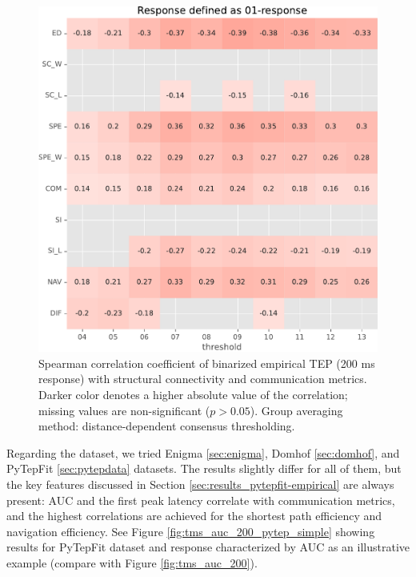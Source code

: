 \begin{figure}
    \centering
    \includegraphics[width=\textwidth]{images/nootebook_generated/tmseeg_results/empirical/200/not_over_threshold_nan/Mica-Mics_dist/Response defined as 01-response.pdf}
    \caption[Binarized TEP (200 ms) correlations (dist)]{Spearman correlation coefficient of binarized empirical TEP (200 ms response) with structural connectivity and communication metrics. Darker color denotes a higher absolute value of the correlation; missing values are non-significant ($p>0.05$). Group averaging method: distance-dependent consensus thresholding.}
    \label{fig:tms_01_200_dist}
\end{figure}

Regarding the dataset, we tried Enigma \ref{sec:enigma}, Domhof \ref{sec:domhof}, and PyTepFit \ref{sec:pytepdata} datasets. The results slightly differ for all of them, but the key features discussed in Section \ref{sec:results_pytepfit-empirical} are always present: AUC and the first peak latency correlate with communication metrics, and the highest correlations are achieved for the shortest path efficiency and navigation efficiency. See Figure \ref{fig:tms_auc_200_pytep_simple} showing results for PyTepFit dataset and response characterized by AUC as an illustrative example (compare with Figure \ref{fig:tms_auc_200}).

